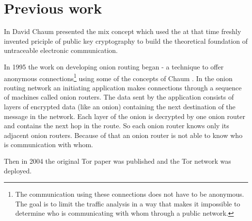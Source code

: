 



\section{Previous work}

In \cite{chaum1981untraceable} David Chaum presented the mix concept which used the at that time freshly invented priciple of public key cryptography to build the theoretical foundation of untraceable electronic communication.

In 1995 the work on developing onion routing began - a technique to offer anonymous connections\footnote{
	The communication using these connections does not have to be anonymous. The goal is to limit the traffic analysis in a way that makes it impossible to determine who is communicating with whom through a public network.
} using some of the concepts of Chaum \cite{onionroutingproject, goldschlag1996hiding, reed1998anonymous}. In the onion routing network an initiating application makes connections through a sequence of machines called onion routers. The data sent by the application consists of layers of encrypted data (like an onion) containing the next destination of the message in the network. Each layer of the onion is decrypted by one onion router and contains the next hop in the route. So each onion router knows only its adjacent onion routers. Because of that an onion router is not able to know who is communication with whom. 

%
%	
%	
%		
%		
%	
%	
%	
%	
%	
%	
%	
%	
%	
%	
%	
%	
%	
	
Then in 2004 the original Tor paper was published \cite{tor2004original} and the Tor network was deployed.
